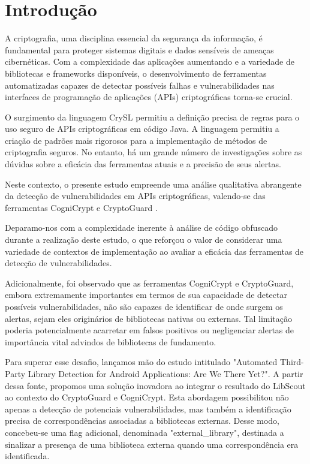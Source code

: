 \section{Introdução}%

A criptografia, uma disciplina essencial da segurança da informação, é fundamental para proteger sistemas digitais e dados sensíveis de ameaças cibernéticas. \cite{what_is_cryptography} Com a complexidade das aplicações aumentando e a variedade de bibliotecas e frameworks disponíveis, o desenvolvimento de ferramentas automatizadas capazes de detectar possíveis falhas e vulnerabilidades nas interfaces de programação de aplicações (APIs) criptográficas torna-se crucial. \cite{api_misuses_zhang}

O surgimento da linguagem CrySL permitiu a definição precisa de regras para o uso seguro de APIs criptográficas em código Java. \cite{CogniCrypt} A linguagem permitiu a criação de padrões mais rigorosos para a implementação de métodos de criptografia seguros. No entanto, há um grande número de investigações sobre as dúvidas sobre a eficácia das ferramentas atuais e a precisão de seus alertas.

Neste contexto, o presente estudo empreende uma análise qualitativa abrangente da detecção de vulnerabilidades em APIs criptográficas, valendo-se das ferramentas CogniCrypt \cite{CogniCrypt} e CryptoGuard \cite{CryptoGuard}.

Deparamo-nos com a complexidade inerente à análise de código obfuscado durante a realização deste estudo, o que reforçou o valor de considerar uma variedade de contextos de implementação ao avaliar a eficácia das ferramentas de detecção de vulnerabilidades. \cite{api_tpl_zhang}

Adicionalmente, foi observado que as ferramentas CogniCrypt e CryptoGuard, embora extremamente importantes em termos de sua capacidade de detectar possíveis vulnerabilidades, não são capazes de identificar de onde surgem os alertas, sejam eles originários de bibliotecas nativas ou externas. \cite{perception_developers} Tal limitação poderia potencialmente acarretar em falsos positivos ou negligenciar alertas de importância vital advindos de bibliotecas de fundamento.

Para superar esse desafio, lançamos mão do estudo intitulado "Automated Third-Party Library Detection for Android Applications: Are We There Yet?". \cite{perception_developers} A partir dessa fonte, propomos uma solução inovadora ao integrar o resultado do LibScout ao contexto do CryptoGuard e CogniCrypt. Esta abordagem possibilitou não apenas a detecção de potenciais vulnerabilidades, mas também a identificação precisa de correspondências associadas a bibliotecas externas. Desse modo, concebeu-se uma flag adicional, denominada "external\_library", destinada a sinalizar a presença de uma biblioteca externa quando uma correspondência era identificada.

